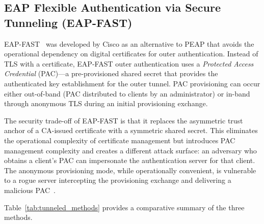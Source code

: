 \documentclass[journal]{IEEEtran}
\begin{document}
\subsection{EAP Flexible Authentication via Secure Tunneling (EAP-FAST)}

EAP-FAST~\cite{rfc4851} was developed by Cisco as an alternative to PEAP that
avoids the operational dependency on digital certificates for outer authentication.
Instead of TLS with a certificate, EAP-FAST outer authentication uses a
\emph{Protected Access Credential} (PAC)---a pre-provisioned shared secret that
provides the authenticated key establishment for the outer tunnel. PAC provisioning
can occur either out-of-band (PAC distributed to clients by an administrator) or
in-band through anonymous TLS during an initial provisioning exchange.

The security trade-off of EAP-FAST is that it replaces the asymmetric trust anchor
of a CA-issued certificate with a symmetric shared secret. This eliminates the
operational complexity of certificate management but introduces PAC management
complexity and creates a different attack surface: an adversary who obtains a client's
PAC can impersonate the authentication server for that client. The anonymous
provisioning mode, while operationally convenient, is vulnerable to a rogue server
intercepting the provisioning exchange and delivering a malicious PAC~\cite{rfc4851}.

Table~\ref{tab:tunneled_methods} provides a comparative summary of the three methods.

\begin{table}[!t]
\caption{Comparison of Tunnelled EAP Methods}
\label{tab:tunneled_methods}
\centering
{}
\end{table}
\end{document}
